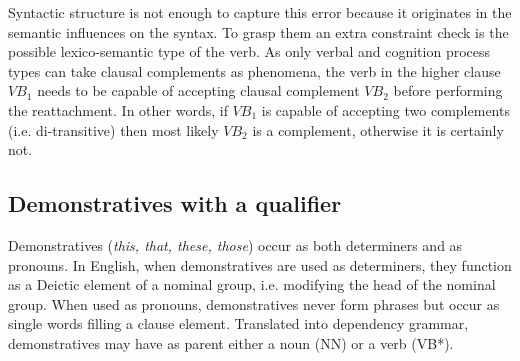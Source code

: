     Syntactic structure is not enough to capture this error because it originates in the semantic influences on the syntax. To grasp them an extra constraint check is the possible lexico-semantic type of the verb. As only verbal and cognition process types can take clausal complements as phenomena, the verb in the higher clause $VB_1$ needs to be capable of accepting clausal complement $VB_2$ before performing the reattachment. In other words, if $VB_1$ is capable of accepting two complements (i.e. di-transitive) then most likely $VB_2$ is a complement, otherwise it is certainly not.



\subsection{Demonstratives with a qualifier}
    Demonstratives (\textit{this, that, these, those}) occur as both determiners and as pronouns. In English, when demonstratives are used as determiners, they function as a Deictic element of a nominal group, i.e. modifying the head of the nominal group. When used as pronouns, demonstratives never form phrases but occur as single words filling a clause element. Translated into dependency grammar, demonstratives may have as parent either a noun (NN) or a verb (VB*). 
    
